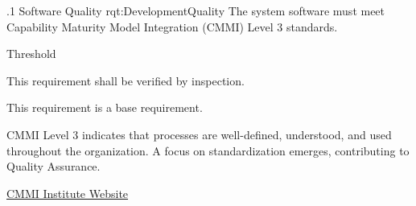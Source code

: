 \ONERQMT
{\RqtNumberBase.1}
{Software Quality}
{rqt:DevelopmentQuality}
{The system software must meet Capability Maturity Model Integration (CMMI) Level 3 standards.}
{
	\item [Phase 1] Threshold
}
{This requirement shall be verified by inspection.}
{
	\item [N/A] This requirement is a base requirement.
}
{
	\item CMMI Level 3 indicates that processes are well-defined, understood, and used throughout the organization. A focus on standardization emerges, contributing to Quality Assurance.
	\item \href{https://cmmiinstitute.com/}{CMMI Institute Website}
}
